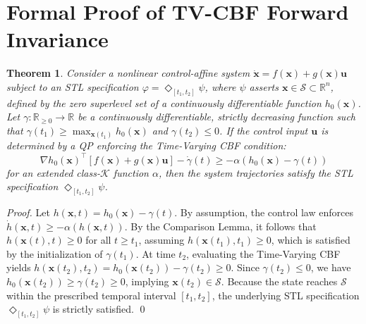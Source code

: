 \documentclass[conference]{IEEEtran}
\newtheorem{theorem}{Theorem}
\begin{document}
\section{Formal Proof of TV-CBF Forward Invariance}
\begin{theorem}
Consider a nonlinear control-affine system $\dot{\mathbf{x}} = f(\mathbf{x}) + g(\mathbf{x})\mathbf{u}$ subject to an STL specification $\varphi = \Diamond_{[t_1, t_2]} \psi$, where $\psi$ asserts $\mathbf{x} \in \mathcal{S} \subset \mathbb{R}^n$, defined by the zero superlevel set of a continuously differentiable function $h_0(\mathbf{x})$. Let $\gamma: \mathbb{R}_{\ge 0} \rightarrow \mathbb{R}$ be a continuously differentiable, strictly decreasing function such that $\gamma(t_1) \ge \max_{\mathbf{x}(t_1)} h_0(\mathbf{x})$ and $\gamma(t_2) \le 0$. If the control input $\mathbf{u}$ is determined by a QP enforcing the Time-Varying CBF condition:
\begin{equation*}
\nabla h_0(\mathbf{x})^\top [f(\mathbf{x}) + g(\mathbf{x})\mathbf{u}] - \dot{\gamma}(t) \ge -\alpha(h_0(\mathbf{x}) - \gamma(t))
\end{equation*}
for an extended class-$\mathcal{K}$ function $\alpha$, then the system trajectories satisfy the STL specification $\Diamond_{[t_1, t_2]} \psi$.
\end{theorem}
\begin{proof}
Let $h(\mathbf{x}, t) = h_0(\mathbf{x}) - \gamma(t)$. By assumption, the control law enforces $\dot{h}(\mathbf{x}, t) \ge -\alpha(h(\mathbf{x}, t))$. By the Comparison Lemma, it follows that $h(\mathbf{x}(t), t) \ge 0$ for all $t \ge t_1$, assuming $h(\mathbf{x}(t_1), t_1) \ge 0$, which is satisfied by the initialization of $\gamma(t_1)$. At time $t_2$, evaluating the Time-Varying CBF yields $h(\mathbf{x}(t_2), t_2) = h_0(\mathbf{x}(t_2)) - \gamma(t_2) \ge 0$. Since $\gamma(t_2) \le 0$, we have $h_0(\mathbf{x}(t_2)) \ge \gamma(t_2) \ge 0$, implying $\mathbf{x}(t_2) \in \mathcal{S}$. Because the state reaches $\mathcal{S}$ within the prescribed temporal interval $[t_1, t_2]$, the underlying STL specification $\Diamond_{[t_1, t_2]} \psi$ is strictly satisfied. \qed
\end{proof}

\balance
\nocite{*}


\end{document}
